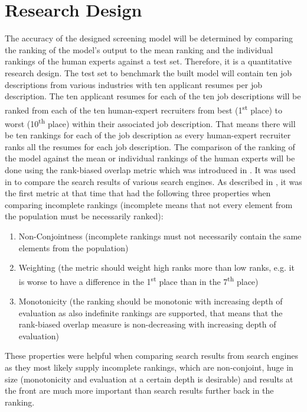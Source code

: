 \documentclass[draft,final]{thesisclass} %
\begin{document}
\section{Research Design} \label{research_design}
The accuracy of the designed screening model will be determined by comparing the ranking of the model's output to the mean ranking and the individual rankings of the human experts against a test set. 
Therefore, it is a quantitative research design. 
The test set to benchmark the built model will contain ten job descriptions from various industries with ten applicant resumes per job description. 
The ten applicant resumes for each of the ten job descriptions will be ranked from each of the ten human-expert recruiters from best (1\textsuperscript{st} place) to worst (10\textsuperscript{th} place) within their associated job description. 
That means there will be ten rankings for each of the job description as every human-expert recruiter ranks all the resumes for each job description. 
The comparison of the ranking of the model against the mean or individual rankings of the human experts will be done using the rank-biased overlap metric which was introduced in \cite{rank_biased_overlap}. 
It was used in \cite{rank_biased_overlap} to compare the search results of various search engines.
As described in \cite[1]{rank_biased_overlap}, it was the first metric at that time that had the following three properties when comparing incomplete rankings (incomplete means that not every element from the population must be necessarily ranked):
\begin{enumerate}
\item Non-Conjointness (incomplete rankings must not necessarily contain the same elements from the population)
\item Weighting (the metric should weight high ranks more than low ranks, e.g. it is worse to have a difference in the 1\textsuperscript{st} place than in the 7\textsuperscript{th} place)
\item Monotonicity (the ranking should be monotonic with increasing depth of evaluation as also indefinite rankings are supported, that means that the rank-biased overlap measure is non-decreasing with increasing depth of evaluation)
\end{enumerate}
These properties were helpful when comparing search results from search engines as they most likely supply incomplete rankings, which are non-conjoint, huge in size (monotonicity and evaluation at a certain depth is desirable) and results at the front are much more important than search results further back in the ranking.
\end{document}
